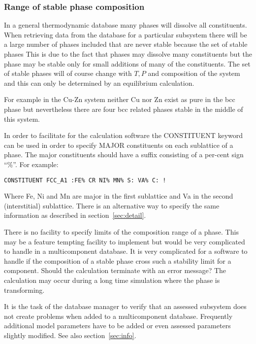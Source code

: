 \documentclass[12pt]{article}
\begin{document}
\subsubsection{Range of stable phase composition}\label{sec:phaserange}

In a general thermodynamic database many phases will dissolve all
constituents.  When retrieving data from the database for a particular
subsystem there will be a large number of phases included that are
never stable because the set of stable phases This is due to the fact
that phases may dissolve many constituents but the phase may be stable
only for small additions of many of the constituents.  The set of
stable phases will of course change with $T, P$ and composition of the
system and this can only be determined by an equilibrium calculation.

For example in the Cu-Zn system neither Cu nor Zn exist as pure in the
bcc phase but nevertheless there are four bcc related phases stable in
the middle of this system.

In order to facilitate for the calculation software the CONSTITUENT
keyword can be used in order to specify MAJOR constituents on each
sublattice of a phase.  The major constituents should have a suffix
consisting of a per-cent sign ``\%''.  For example:

\begin{verbatim}
CONSTITUENT FCC_A1 :FE% CR NI% MN% S: VA% C: !
\end{verbatim}

Where Fe, Ni and Mn are major in the first sublattice and Va in the
second (interstitial) sublattice.  There is an alternative way to
specify the same information as described in section~\ref{sec:detail}.

There is no facility to specify limits of the composition range of a
phase.  This may be a feature tempting facility to implement but would
be very complicated to handle in a multicomponent database.  It is
very complicated for a software to handle if the composition of a
stable phase cross such a stability limit for a component.  Should the
calculation terminate with an error message?  The calculation may 
occur during a long time simulation where the phase is transforming.

It is the task of the database manager to verify that an assessed
subsystem does not create problems when added to a multicomponent
database.  Frequently additional model parameters have to be added or
even assessed parameters slightly modified.  See also
section~\ref{sec:info}.
\end{document}
